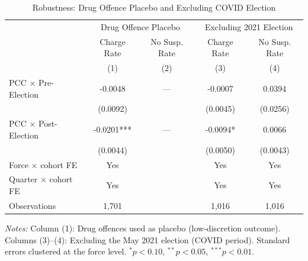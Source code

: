\begin{table}[htbp]
\centering
\caption{Robustness: Drug Offence Placebo and Excluding COVID Election}
\label{tab:robustness}
\begin{tabular}{lcccc}
\hline\hline
 & \multicolumn{2}{c}{Drug Offence Placebo} & \multicolumn{2}{c}{Excluding 2021 Election} \\
 & Charge Rate & No Susp. Rate & Charge Rate & No Susp. Rate \\
 & (1) & (2) & (3) & (4) \\
\hline
PCC $\times$ Pre-Election & -0.0048 & --- & -0.0007 & 0.0394 \\
 & (0.0092) & & (0.0045) & (0.0256) \\
PCC $\times$ Post-Election & -0.0201*** & --- & -0.0094* & 0.0066 \\
 & (0.0044) & & (0.0050) & (0.0043) \\
\hline
Force $\times$ cohort FE & Yes & & Yes & Yes \\
Quarter $\times$ cohort FE & Yes & & Yes & Yes \\
Observations & 1,701 & & 1,016 & 1,016 \\
\hline\hline
\end{tabular}
\begin{tablenotes}[flushleft]
\item \textit{Notes:} Column (1): Drug offences used as placebo (low-discretion outcome). Columns (3)--(4): Excluding the May 2021 election (COVID period). Standard errors clustered at the force level. $^{*}p<0.10$, $^{**}p<0.05$, $^{***}p<0.01$.
\end{tablenotes}
\end{table}

